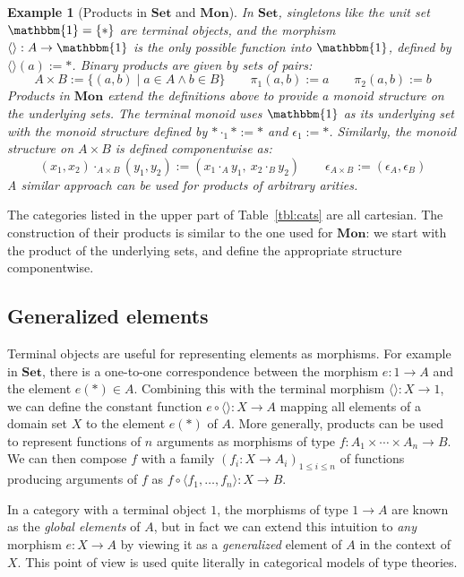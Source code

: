 \documentclass[11pt,oneside,draft]{book}
\newtheorem{example}[theorem]{Example}
\theoremstyle{definition}
\begin{document}
\begin{example}[Products in $\mathbf{Set}$ and $\mathbf{Mon}$] %
In $\mathbf{Set}$,
singletons like the unit set $\mathbbm{1} = \{ * \}$
are terminal objects,
and the morphism $\langle \rangle : A \rightarrow \mathbbm{1}$
is the only possible function into $\mathbbm{1}$,
defined by $\langle \rangle(a) := *$.
Binary products are given by sets of pairs:
\[
  A \times B := \{ (a, b) \mid a \in A \wedge b \in B \}
  \qquad
  \pi_1(a, b) := a
  \qquad
  \pi_2(a, b) := b
\]
Products in $\mathbf{Mon}$ extend the definitions above
to provide a monoid structure on the underlying sets.
The terminal monoid uses $\mathbbm{1}$ as its underlying set
with the monoid structure
defined by ${*} \cdot_1 {*} := {*}$ and $\epsilon_1 := {*}$.
Similarly,
the monoid structure on $A \times B$ is defined componentwise as:
\[
  (x_1, x_2) \cdot_{A \times B} (y_1, y_2) :=
    (x_1 \cdot_A y_1, \: x_2 \cdot_B y_2)
  \qquad
  \epsilon_{A \times B} :=
    (\epsilon_A, \epsilon_B)
\]
A similar approach can be used for products of arbitrary arities.
\end{example}

The categories listed
in the upper part of Table~\ref{tbl:cats} are all cartesian.
The construction of their products is similar to
the one used for $\mathbf{Mon}$:
we start with the product of the underlying sets,
and define the appropriate structure componentwise.


\subsection{Generalized elements} %

Terminal objects are useful for representing elements as morphisms.
For example in $\mathbf{Set}$,
there is a one-to-one correspondence between the morphism
$e : 1 \rightarrow A$ and the element $e(*) \in A$.
Combining this with the terminal morphism $\langle \rangle : X \rightarrow 1$,
we can define the constant function
$e \circ \langle \rangle : X \rightarrow A$
mapping all elements of a domain set $X$
to the element $e(*)$ of $A$.
More generally,
products can be used to represent functions
of $n$ arguments as morphisms of type
$f : A_1 \times \cdots \times A_n \rightarrow B$.
We can then compose $f$ with a family
$(f_i : X \rightarrow A_i)_{1 \le i \le n}$
of functions producing arguments of $f$
as $f \circ \langle f_1, \ldots, f_n \rangle : X \rightarrow B$.

In a category with a terminal object $1$,
the morphisms of type $1 \rightarrow A$ are known as
the \emph{global elements} of $A$,
but in fact we can extend this intuition to \emph{any}
morphism $e : X \rightarrow A$
by viewing it as a \emph{generalized} element of $A$
in the context of $X$.
This point of view is used quite literally
in categorical models of type theories.
\end{document}
